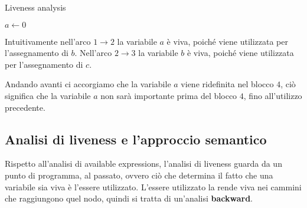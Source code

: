 \begin{minipage}{0.45\textwidth}
    \begin{algorithm}[H]
        \DontPrintSemicolon
        \caption{Liveness analysis}
        $a \gets 0$\;
        \;
    \end{algorithm}

    Intuitivamente nell'arco $1 \to 2$ la variabile $a$ è viva, poiché viene utilizzata
    per l'assegnamento di $b$. Nell'arco $2 \to 3$ la variabile $b$ è viva, poiché viene
    utilizzata per l'assegnamento di $c$.

    Andando avanti ci accorgiamo che la variabile $a$ viene ridefinita nel blocco $4$,
    ciò significa che la variabile $a$ non sarà importante prima del blocco $4$, fino 
    all'utilizzo precedente.
\end{minipage}
\begin{minipage}{0.5\textwidth}
    \begin{figure}[H]
        \centering
    \end{figure}
\end{minipage}

\subsection{Analisi di liveness e l'approccio semantico}

Rispetto all'analisi di available expressions, l'analisi di liveness guarda da un punto 
di programma, al passato, ovvero ciò che determina il fatto che una variabile sia viva
è l'essere utilizzato. L'essere utilizzato la rende viva nei cammini che raggiungono 
quel nodo, quindi si tratta di un'analisi \textbf{backward}.

